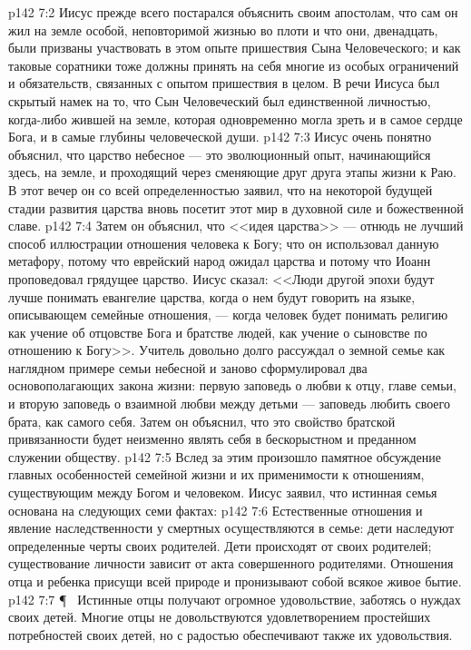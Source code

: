 \vs p142 7:2 Иисус прежде всего постарался объяснить своим апостолам, что сам он жил на земле особой, неповторимой жизнью во плоти и что они, двенадцать, были призваны участвовать в этом опыте пришествия Сына Человеческого; и как таковые соратники тоже должны принять на себя многие из особых ограничений и обязательств, связанных с опытом пришествия в целом. В речи Иисуса был скрытый намек на то, что Сын Человеческий был единственной личностью, когда\hyp{}либо жившей на земле, которая одновременно могла зреть и в самое сердце Бога, и в самые глубины человеческой души.
\vs p142 7:3 Иисус очень понятно объяснил, что царство небесное --- это эволюционный опыт, начинающийся здесь, на земле, и проходящий через сменяющие друг друга этапы жизни к Раю. В этот вечер он со всей определенностью заявил, что на некоторой будущей стадии развития царства вновь посетит этот мир в духовной силе и божественной славе.
\vs p142 7:4 Затем он объяснил, что <<идея царства>> --- отнюдь не лучший способ иллюстрации отношения человека к Богу; что он использовал данную метафору, потому что еврейский народ ожидал царства и потому что Иоанн проповедовал грядущее царство. Иисус сказал: <<Люди другой эпохи будут лучше понимать евангелие царства, когда о нем будут говорить на языке, описывающем семейные отношения, --- когда человек будет понимать религию как учение об отцовстве Бога и братстве людей, как учение о сыновстве по отношению к Богу>>. Учитель довольно долго рассуждал о земной семье как наглядном примере семьи небесной и заново сформулировал два основополагающих закона жизни: первую заповедь о любви к отцу, главе семьи, и вторую заповедь о взаимной любви между детьми --- заповедь любить своего брата, как самого себя. Затем он объяснил, что это свойство братской привязанности будет неизменно являть себя в бескорыстном и преданном служении обществу.
\vs p142 7:5 Вслед за этим произошло памятное обсуждение главных особенностей семейной жизни и их применимости к отношениям, существующим между Богом и человеком. Иисус заявил, что истинная семья основана на следующих семи фактах:
\vs p142 7:6 \bibnobreakspace {} Естественные отношения и явление наследственности у смертных осуществляются в семье: дети наследуют определенные черты своих родителей. Дети происходят от своих родителей; существование личности зависит от акта совершенного родителями. Отношения отца и ребенка присущи всей природе и пронизывают собой всякое живое бытие.
\vs p142 7:7 \P\ \bibnobreakspace {} Истинные отцы получают огромное удовольствие, заботясь о нуждах своих детей. Многие отцы не довольствуются удовлетворением простейших потребностей своих детей, но с радостью обеспечивают также их удовольствия.
